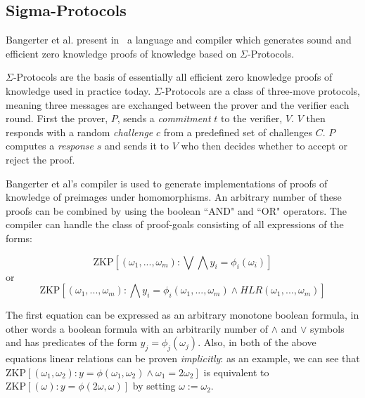 \documentclass{sig-alternate}
\begin{document}
	\subsection{Sigma-Protocols}
		Bangerter et al. present in~\cite{Sigma:2009} a language and compiler
		which generates sound and efficient zero knowledge proofs of knowledge
		based on $\Sigma$-Protocols.	
	
		$\Sigma$-Protocols are the basis of essentially all efficient zero knowledge
		proofs of knowledge used in practice today. $\Sigma$-Protocols are a class of
		three-move protocols, meaning three messages are exchanged between the prover
		and the verifier each round. First the prover, $P$, sends a \textit{commitment} 
		$t$ to the
		verifier, $V$. $V$ then responds with a random \textit{challenge} $c$ from a 
		predefined set of challenges $C$. $P$ computes a \textit{response} $s$ and sends
		it to $V$ who then decides whether to accept or reject the proof.
		
		Bangerter et al's compiler is used to generate implementations of proofs
		of knowledge of preimages under homomorphisms. An arbitrary number of these
		proofs can be combined by using the boolean ``AND" and ``OR" operators.
		The compiler can handle the class of proof-goals consisting of
		all expressions of the forms:
		
		\begin{equation*}
		\text{ZKP}[(\omega_{1},...,\omega_{m}):\bigvee\bigwedge y_{i} = \phi_{i}(\omega_{i})]
		\end{equation*}
		or
		\begin{equation*}
		\text{ZKP}[(\omega_{1},...,\omega_{m}):\bigwedge y_{i} = \phi_{i}(\omega_{1},...,\omega_{m})\land HLR(\omega_{1},...,\omega_{m})]
		\end{equation*}
		
		The first equation can be expressed
		as an arbitrary monotone boolean formula, in other words a boolean formula
		with an arbitrarily number of $\land$ and $\lor$ symbols and has predicates of
		the form $y_{j} = \phi_{j}(\omega_{j}).$ Also, in both of the above equations
		linear relations can be proven \textit{implicitly}: as an example, we can
		see that $\text{ZKP}[(\omega_{1},\omega_{2}):y = \phi(\omega_{1},\omega_{2}) \land \omega_{1} = 2\omega_{2}]$
		is equivalent to $\text{ZKP}[(\omega):y = \phi(2\omega,\omega)]$ by setting $\omega:=\omega_{2}$.
		
\end{document}

